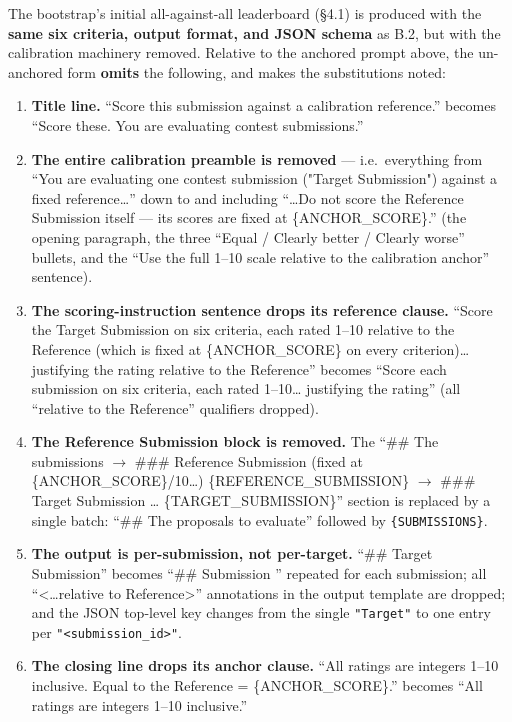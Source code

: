 \documentclass{article}
\providecommand{\tightlist}{\setlength{\itemsep}{0pt}\setlength{\parskip}{0pt}}
\begin{document}
The bootstrap's initial all-against-all leaderboard (\S{}4.1) is produced with the \textbf{same six criteria, output format, and JSON schema} as B.2, but with the calibration machinery removed. Relative to the anchored prompt above, the un-anchored form \textbf{omits} the following, and makes the substitutions noted:

\begin{enumerate}
\def\labelenumi{\arabic{enumi}.}
\tightlist
\item
  \textbf{Title line.} ``Score this submission against a calibration reference.'' becomes ``Score these. You are evaluating contest submissions.''
\item
  \textbf{The entire calibration preamble is removed} --- i.e.~everything from ``You are evaluating one contest submission ("Target Submission") against a fixed reference\ldots{}'' down to and including ``\ldots Do not score the Reference Submission itself --- its scores are fixed at \{ANCHOR\_\allowbreak{}SCORE\}.'' (the opening paragraph, the three ``Equal / Clearly better / Clearly worse'' bullets, and the ``Use the full 1--10 scale relative to the calibration anchor'' sentence).
\item
  \textbf{The scoring-instruction sentence drops its reference clause.} ``Score the Target Submission on six criteria, each rated 1--10 relative to the Reference (which is fixed at \{ANCHOR\_\allowbreak{}SCORE\} on every criterion)\ldots{} justifying the rating relative to the Reference'' becomes ``Score each submission on six criteria, each rated 1--10\ldots{} justifying the rating'' (all ``relative to the Reference'' qualifiers dropped).
\item
  \textbf{The Reference Submission block is removed.} The ``\#\# The submissions \ensuremath{\rightarrow} \#\#\# Reference Submission (fixed at \{ANCHOR\_\allowbreak{}SCORE\}/10\ldots) \{REFERENCE\_\allowbreak{}SUBMISSION\} \ensuremath{\rightarrow} \#\#\# Target Submission \ldots{} \{TARGET\_\allowbreak{}SUBMISSION\}'' section is replaced by a single batch: ``\#\# The proposals to evaluate'' followed by \texttt{\{SUBMISSIONS\}}.
\item
  \textbf{The output is per-submission, not per-target.} ``\#\# Target Submission'' becomes ``\#\# Submission '' repeated for each submission; all ``\textless\ldots relative to Reference\textgreater{}'' annotations in the output template are dropped; and the JSON top-level key changes from the single \texttt{"Target"} to one entry per \texttt{"\textless{}submission\_\allowbreak{}id\textgreater{}"}.
\item
  \textbf{The closing line drops its anchor clause.} ``All ratings are integers 1--10 inclusive. Equal to the Reference = \{ANCHOR\_\allowbreak{}SCORE\}.'' becomes ``All ratings are integers 1--10 inclusive.''
\end{enumerate}
\end{document}
